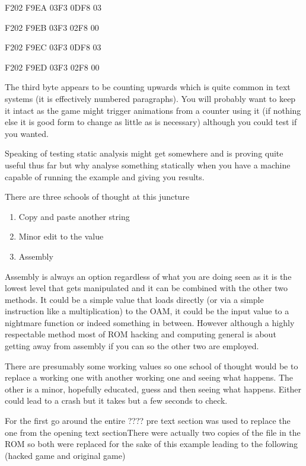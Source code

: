 \documentclass[
]{book}
\providecommand{\tightlist}{%
  \setlength{\itemsep}{0pt}\setlength{\parskip}{0pt}}
\begin{document}
F202 F9EA 03F3 0DF8 03

F202 F9EB 03F3 02F8 00

F202 F9EC 03F3 0DF8 03

F202 F9ED 03F3 02F8 00

The third byte appears to be counting upwards which is quite common in text systems (it is effectively numbered paragraphs). You will probably want to keep it intact as the game might trigger animations from a counter using it (if nothing else it is good form to change as little as is necessary) although you could test if you wanted.

Speaking of testing static analysis might get somewhere and is proving quite useful thus far but why analyse something statically when you have a machine capable of running the example and giving you results.

There are three schools of thought at this juncture

\begin{enumerate}
\def\labelenumi{\arabic{enumi}.}
\tightlist
\item
  Copy and paste another string
\item
  Minor edit to the value
\item
  Assembly
\end{enumerate}

Assembly is always an option regardless of what you are doing seen as it is the lowest level that gets manipulated and it can be combined with the other two methods. It could be a simple value that loads directly (or via a simple instruction like a multiplication) to the OAM, it could be the input value to a nightmare function or indeed something in between. However although a highly respectable method most of ROM hacking and computing general is about getting away from assembly if you can so the other two are employed.

There are presumably some working values so one school of thought would be to replace a working one with another working one and seeing what happens. The other is a minor, hopefully educated, guess and then seeing what happens. Either could lead to a crash but it takes but a few seconds to check.

For the first go around the entire ???? pre text section was used to replace the one from the opening text sectionThere were actually two copies of the file in the ROM so both were replaced for the sake of this example leading to the following (hacked game and original game)
\end{document}
